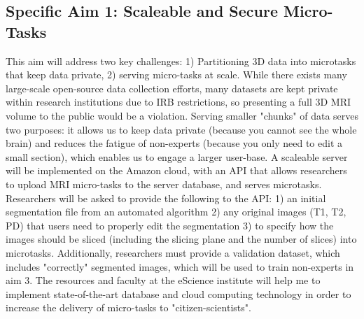 \subsection*{Specific Aim 1: Scaleable and Secure Micro-Tasks}

This aim will address two key challenges: 1) Partitioning 3D data into microtasks that keep data private, 2) serving micro-tasks at scale. While there exists many large-scale open-source data collection efforts, many datasets are kept private within research institutions due to  IRB restrictions, so presenting a full 3D MRI volume to the public would be a violation. Serving smaller "chunks" of data serves two purposes: it allows us to keep data private (because you cannot see the whole brain) and reduces the fatigue of non-experts (because you only need to edit a small section), which enables us to engage a larger user-base. A scaleable server will be implemented on the Amazon cloud, with an API that allows researchers to upload MRI micro-tasks to the server database, and serves microtasks. Researchers will be asked to provide the following to the API: 1) an initial segmentation file from an automated algorithm 2) any original images (T1, T2, PD) that  users need to properly edit the segmentation 3) to specify how the images should be sliced (including the slicing plane and the number of slices) into microtasks. Additionally, researchers must provide a validation dataset, which includes "correctly" segmented images, which will be used to train non-experts in aim 3. The resources and faculty at the eScience institute will help me to implement state-of-the-art database and cloud computing technology in order to increase the delivery of micro-tasks to "citizen-scientists".